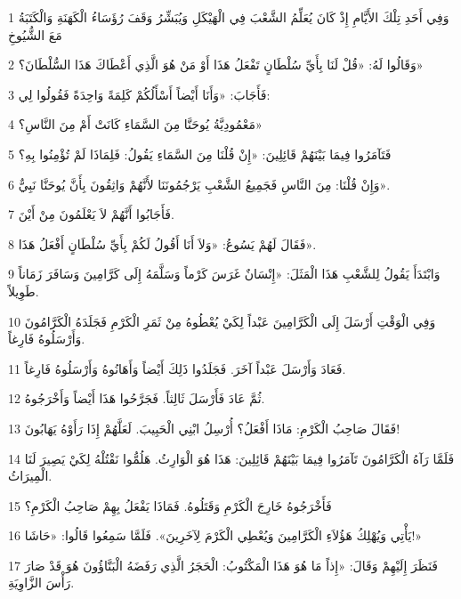 \par 1 وَفِي أَحَدِ تِلْكَ الأَيَّامِ إِذْ كَانَ يُعَلِّمُ الشَّعْبَ فِي الْهَيْكَلِ وَيُبَشِّرُ وَقَفَ رُؤَسَاءُ الْكَهَنَةِ وَالْكَتَبَةُ مَعَ الشُّيُوخِ
\par 2 وَقَالُوا لَهُ: «قُلْ لَنَا بِأَيِّ سُلْطَانٍ تَفْعَلُ هَذَا أَوْ مَنْ هُوَ الَّذِي أَعْطَاكَ هَذَا السُّلْطَانَ؟»
\par 3 فَأَجَابَ: «وَأَنَا أَيْضاً أَسْأَلُكُمْ كَلِمَةً وَاحِدَةً فَقُولُوا لِي:
\par 4 مَعْمُودِيَّةُ يُوحَنَّا مِنَ السَّمَاءِ كَانَتْ أَمْ مِنَ النَّاسِ؟»
\par 5 فَتَآمَرُوا فِيمَا بَيْنَهُمْ قَائِلِينَ: «إِنْ قُلْنَا مِنَ السَّمَاءِ يَقُولُ: فَلِمَاذَا لَمْ تُؤْمِنُوا بِهِ؟
\par 6 وَإِنْ قُلْنَا: مِنَ النَّاسِ فَجَمِيعُ الشَّعْبِ يَرْجُمُونَنَا لأَنَّهُمْ وَاثِقُونَ بِأَنَّ يُوحَنَّا نَبِيٌّ».
\par 7 فَأَجَابُوا أَنَّهُمْ لاَ يَعْلَمُونَ مِنْ أَيْنَ.
\par 8 فَقَالَ لَهُمْ يَسُوعُ: «وَلاَ أَنَا أَقُولُ لَكُمْ بِأَيِّ سُلْطَانٍ أَفْعَلُ هَذَا».
\par 9 وَابْتَدَأَ يَقُولُ لِلشَّعْبِ هَذَا الْمَثَلَ: «إِنْسَانٌ غَرَسَ كَرْماً وَسَلَّمَهُ إِلَى كَرَّامِينَ وَسَافَرَ زَمَاناً طَوِيلاً.
\par 10 وَفِي الْوَقْتِ أَرْسَلَ إِلَى الْكَرَّامِينَ عَبْداً لِكَيْ يُعْطُوهُ مِنْ ثَمَرِ الْكَرْمِ فَجَلَدَهُ الْكَرَّامُونَ وَأَرْسَلُوهُ فَارِغاً.
\par 11 فَعَادَ وَأَرْسَلَ عَبْداً آخَرَ. فَجَلَدُوا ذَلِكَ أَيْضاً وَأَهَانُوهُ وَأَرْسَلُوهُ فَارِغاً.
\par 12 ثُمَّ عَادَ فَأَرْسَلَ ثَالِثاً. فَجَرَّحُوا هَذَا أَيْضاً وَأَخْرَجُوهُ.
\par 13 فَقَالَ صَاحِبُ الْكَرْمِ: مَاذَا أَفْعَلُ؟ أُرْسِلُ ابْنِي الْحَبِيبَ. لَعَلَّهُمْ إِذَا رَأَوْهُ يَهَابُونَ!
\par 14 فَلَمَّا رَآهُ الْكَرَّامُونَ تَآمَرُوا فِيمَا بَيْنَهُمْ قَائِلِينَ: هَذَا هُوَ الْوَارِثُ. هَلُمُّوا نَقْتُلْهُ لِكَيْ يَصِيرَ لَنَا الْمِيرَاثُ.
\par 15 فَأَخْرَجُوهُ خَارِجَ الْكَرْمِ وَقَتَلُوهُ. فَمَاذَا يَفْعَلُ بِهِمْ صَاحِبُ الْكَرْمِ؟
\par 16 يَأْتِي وَيُهْلِكُ هَؤُلاَءِ الْكَرَّامِينَ وَيُعْطِي الْكَرْمَ لِآخَرِينَ». فَلَمَّا سَمِعُوا قَالُوا: «حَاشَا!»
\par 17 فَنَظَرَ إِلَيْهِمْ وَقَالَ: «إِذاً مَا هُوَ هَذَا الْمَكْتُوبُ: الْحَجَرُ الَّذِي رَفَضَهُ الْبَنَّاؤُونَ هُوَ قَدْ صَارَ رَأْسَ الزَّاوِيَةِ.
